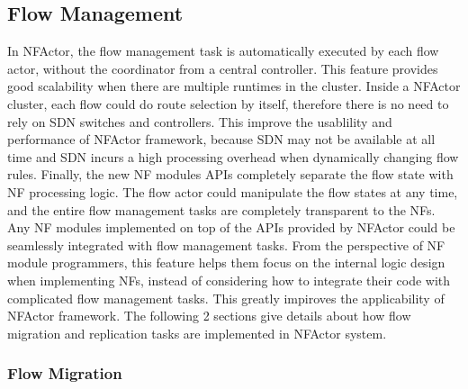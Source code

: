 

\subsection{Flow Management}


In NFActor, the flow management task is automatically executed by each flow actor, without the coordinator from a central controller. This feature provides good scalability when there are multiple runtimes in the cluster. Inside a NFActor cluster, each flow could do route selection by itself, therefore there is no need to rely on SDN switches and controllers. This improve the usablility and performance of NFActor framework, because SDN may not be available at all time and SDN incurs a high processing overhead when dynamically changing flow rules. Finally, the new NF modules APIs completely separate the flow state with NF processing logic. The flow actor could manipulate the flow states at any time, and the entire flow management tasks are completely transparent to the NFs. Any NF modules implemented on top of the APIs provided by NFActor could be seamlessly integrated with flow management tasks. From the perspective of NF module programmers, this feature helps them focus on the internal logic design when implementing NFs, instead of considering how to integrate their code with complicated flow management tasks. This greatly impiroves the applicability of NFActor framework. The following 2 sections give details about how flow migration and replication tasks are implemented in NFActor system.

\subsubsection{Flow Migration}

